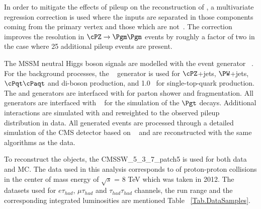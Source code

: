 In order to mitigate the effects of pileup on the reconstruction of \MET, a multivariate regression correction is used where the inputs are separated in those components coming from the primary vertex and those which are not~\cite{CMS-JME-12-002}.
The correction improves the \MET resolution in $\cPZ\to\Pgm\Pgm$ events by roughly a factor of two in the case where 25 additional pileup events are present.


























The MSSM neutral Higgs boson signals are modelled with the event generator ~\cite{Sjostrand:2006za}.
For the background processes, the ~\cite{Alwall:2011uj} generator is used for $\cPZ$+jets, $\PW$+jets, $\cPqt\cPaqt$ and di-boson production, and {\POWHEG} 1.0~\cite{Nason:2004rx,Frixione:2007vw,Alioli:2009je,Alioli:2010xd} for single-top-quark production.
The \POWHEG and \MADGRAPH generators are interfaced with \PYTHIA for parton shower and fragmentation. All generators are interfaced with  \TAUOLA~\cite{Davidson:2010rw} for the simulation of the $\Pgt$ decays. Additional interactions are simulated with \PYTHIA and reweighted to the observed pileup distribution in data. All generated events are processed through a detailed simulation of the CMS detector based on {\GEANTfour}~\cite{Agostinelli:2002hh} and are reconstructed with the same algorithms as the data.














To reconstruct the objects, the CMSSW\_5\_3\_7\_patch5 is used for both data and MC.
The data used in this analysis corresponds to \IL of proton-proton collisions in the center of mass energy of $\sqrt{s}$ = 8 TeV 
which was taken in 2012. The datasets used for $e\tau_{had}$, $\mu\tau_{had}$ and $\tau_{had}\tau_{had}$ channels, the run range and the corresponding integrated luminosities are mentioned Table ~\ref{Tab.DataSamples}.

